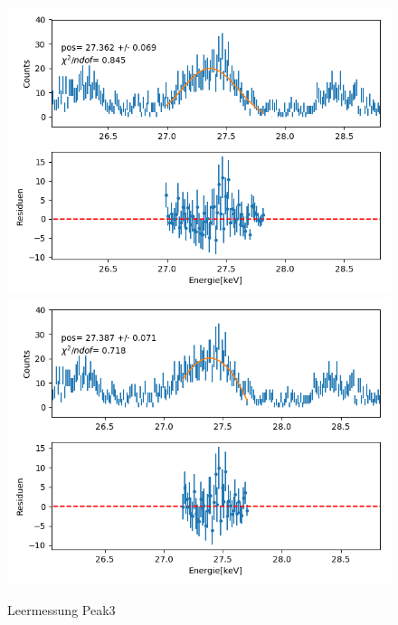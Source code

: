 \documentclass[12pt,a4paper]{article}
\begin{document}
\begin{figure}[H]
\centering
\includegraphics[scale=0.49]{Bilder/alpha_spektren/leer_3_1.png}
\includegraphics[scale=0.49]{Bilder/alpha_spektren/leer_3_2.png}
\caption{Leermessung Peak3}
\end{figure}
\end{document}
